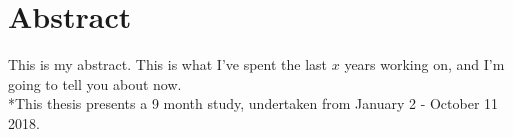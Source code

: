 \chapter{Abstract}

This is my abstract.  This is what I've spent the last $x$ years working on,
and I'm going to tell you about now.\\

*This thesis presents a 9 month study, undertaken from January 2 - October 11 2018. 
